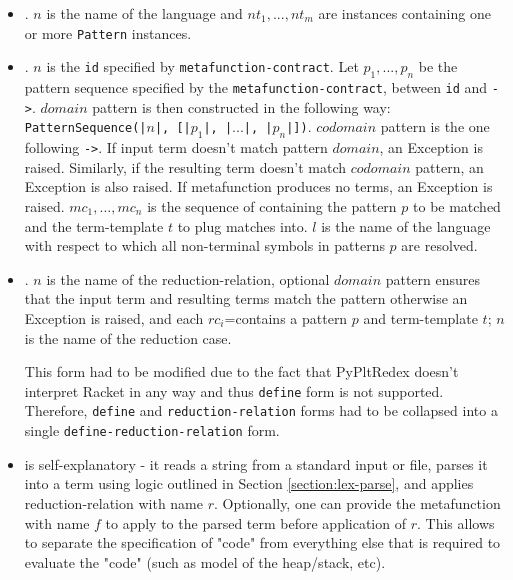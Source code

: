 \begin{itemize}
\item
\TlDefineLanguage. $n$ is the name of the language and $nt_1,...,nt_m$ are \NtDefinitionN \space instances containing one or more \texttt{Pattern} instances.

\item
\TlDefineMetafunction. $n$ is the \texttt{id} specified by \texttt{metafunction-contract}. Let $p_1, ..., p_n$ be the pattern sequence specified by the \texttt{metafunction-contract}, between \texttt{id} and \texttt{->}. $domain$ pattern is then constructed in the following way: \texttt{PatternSequence(|$n$|, [|$p_1$|, |$...$|, |$p_n$|])}. $codomain$ pattern is the one following \texttt{->}. If input term doesn't match pattern $domain$, an Exception is raised. Similarly, if the resulting term doesn't match $codomain$ pattern, an Exception is also raised. If metafunction produces no terms, an Exception is raised. $mc_1,...,mc_n$ is the sequence of \space \MetafunctionCase containing the pattern $p$ to be matched and the term-template $t$ to plug matches into. $l$ is the name of the language with respect to which all non-terminal symbols in patterns $p$ are resolved.

\item \TlDefineReductionRelation. $n$ is the name of the reduction-relation, optional $domain$ pattern ensures that the input term and resulting terms match the pattern otherwise an Exception is raised, and each $rc_i$=\ReductionCase contains a pattern $p$ and term-template $t$; $n$ is the name of the reduction case.

This form had to be modified due to the fact that PyPltRedex doesn't interpret Racket in any way and thus \texttt{define} form is not supported. Therefore, \texttt{define} and \texttt{reduction-relation} forms had to be collapsed into a single \texttt{define-reduction-relation} form.

\item \ReadFromStdinAndApplyReductionRelation \space is self-explanatory -  it reads a string from a standard input or file, parses it into a term using logic outlined in Section \ref{section:lex-parse}, and applies reduction-relation with name $r$. Optionally, one can provide the metafunction with name $f$ to apply to the parsed term before application of $r$. This allows to separate the specification of "code" from everything else that is required to evaluate the "code" (such as model of the heap/stack, etc).
\end{itemize}

